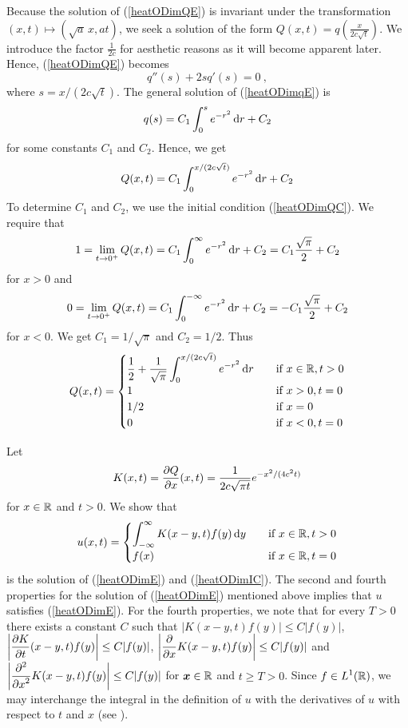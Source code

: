 Because the solution of (\ref{heatODimQE}) is invariant under the
transformation $(x,t) \mapsto (\sqrt{a}\,x, at)$, we seek a solution
of the form
$\displaystyle Q(x,t) = q\left(\frac{x}{2c\sqrt{t}}\right)$.
We introduce the factor $\displaystyle \frac{1}{2c}$ for aesthetic
reasons as it will become apparent later.  Hence, (\ref{heatODimQE}) becomes
\begin{equation} \label{heatODimqE}
q''(s) + 2 s q'(s) = 0 \ ,
\end{equation}
where $s= x/(2c\sqrt{t})$.  The general solution of (\ref{heatODimqE})
is
\[
q(s) = C_1 \int_0^s e^{-r^2} \dx{r} + C_2
\]
for some constants $C_1$ and $C_2$.  Hence, we get
\begin{equation} \label{heatODimQSone}
Q(x,t) = C_1 \int_0^{x/(2c\sqrt{t})} e^{-r^2}\dx{r} + C_2
\end{equation}
To determine $C_1$ and $C_2$, we use the initial condition
(\ref{heatODimQC}).  We require that
\[
1 = \lim_{t\to 0^+} Q(x,t) = C_1 \int_0^{\infty} e^{-r^2} \dx{r} + C_2
= C_1 \frac{\sqrt{\pi}}{2} + C_2
\]
for $x>0$ and
\[
0 = \lim_{t\to 0^+} Q(x,t) = C_1 \int_0^{-\infty} e^{-r^2} \dx{r} + C_2
= - C_1 \frac{\sqrt{\pi}}{2} + C_2
\]
for $x<0$.  We get $C_1 = 1/\sqrt{\pi}$ and $C_2 = 1/2$.  Thus
\[
Q(x,t) = \begin{cases} \displaystyle
\frac{1}{2} + \frac{1}{\sqrt{\pi}} \int_0^{x/(2c\sqrt{t})}
e^{-r^2}\dx{r} & \quad \text{if} \ x\in \RR, t>0 \\
1 & \quad \text{if} \ x>0 , t = 0\\
1/2 & \quad \text{if} \ x = 0 \\
0 & \quad \text{if} \ x< 0 , t = 0
\end{cases}
\]

Let
\[
K(x,t) = \pdydx{Q}{x}(x,t) = \frac{1}{2c\sqrt{\pi t}} e^{-x^2/(4c^2t)}
\]
for $x\in \RR$ and $t > 0$.  We show that
\begin{equation} \label{heatODimSolH}
u(x,t) = \begin{cases}
\displaystyle \int_{-\infty}^{\infty} K(x-y,t) f(y) \dx{y}
& \quad \text{if} \ x\in \RR, t>0 \\
f(x) & \quad \text{if} \ x \in \RR, t = 0 
\end{cases}
\end{equation}
is the solution of (\ref{heatODimE}) and (\ref{heatODimIC}).  The
second and fourth properties for the solution of (\ref{heatODimE})
mentioned above implies that $u$ satisfies (\ref{heatODimE}).  For the
fourth properties, we note that for every $T>0$ there exists a constant
$C$ such that
$\displaystyle |K(x-y,t) f(y)| \leq C |f(y)|$,
$\displaystyle \left| \pdydx{K}{t}(x-y,t) f(y)\right| \leq C |f(y)|$,
$\displaystyle \left| \pdfdx{K}{x}(x-y,t) f(y)\right| \leq C |f(y)|$
and
$\displaystyle \left| \pdfdxn{K}{x}{2}(x-y,t) f(y)\right| \leq C |f(y)|$
for $\VEC{x} \in \RR$ and $t \geq T > 0$.  Since
$\displaystyle f \in L^1(\RR)$, we
may interchange the integral in the definition of $u$ with the
derivatives of $u$ with respect to $t$ and $x$ (see \cite{Flem}).

